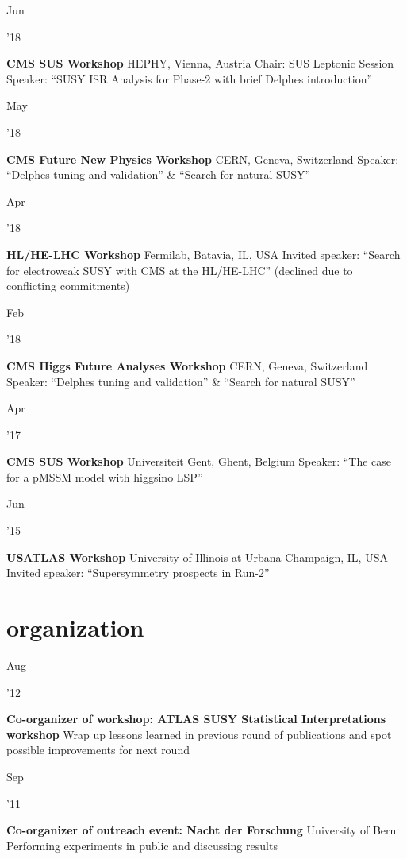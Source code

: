 \documentclass[]{cv} %
\begin{document}
\begin{entrylist}

  \entry
  {\parbox[t]{\parboxWidthOne}{Jun}\parbox[t]{\parboxWidthTwo}{\hfill '18}}
  {\textbf{CMS SUS Workshop}}
  {HEPHY, Vienna, Austria}
  {Chair: SUS Leptonic Session\\
  Speaker: ``SUSY ISR Analysis for Phase-2 with brief Delphes introduction''}

  \entry
  {\parbox[t]{\parboxWidthOne}{May}\parbox[t]{\parboxWidthTwo}{\hfill '18}}
  {\textbf{CMS Future New Physics Workshop}}
  {CERN, Geneva, Switzerland}
  {Speaker: ``Delphes tuning and validation'' \& ``Search for natural SUSY''}

  \entry
  {\parbox[t]{\parboxWidthOne}{Apr}\parbox[t]{\parboxWidthTwo}{\hfill '18}}
  {\textbf{HL/HE-LHC Workshop}}
  {Fermilab, Batavia, IL, USA}
  {Invited speaker: ``Search for electroweak SUSY with CMS at the HL/HE-LHC'' (declined
  due to conflicting commitments)}

  \entry
  {\parbox[t]{\parboxWidthOne}{Feb}\parbox[t]{\parboxWidthTwo}{\hfill '18}}
  {\textbf{CMS Higgs Future Analyses Workshop}}
  {CERN, Geneva, Switzerland}
  {Speaker: ``Delphes tuning and validation'' \& ``Search for natural SUSY''}

  \entry
  {\parbox[t]{\parboxWidthOne}{Apr}\parbox[t]{\parboxWidthTwo}{\hfill '17}}
  {\textbf{CMS SUS Workshop}}
  {Universiteit Gent, Ghent, Belgium}
  {Speaker: ``The case for a pMSSM model with higgsino LSP''}

  \entry
  {\parbox[t]{\parboxWidthOne}{Jun}\parbox[t]{\parboxWidthTwo}{\hfill '15}}
  {\textbf{USATLAS Workshop}}
  {University of Illinois at Urbana-Champaign, IL, USA}
  {Invited speaker: ``Supersymmetry prospects in Run-2''}

\end{entrylist}

\section{organization}

\begin{entrylist}

  \entry
  {\parbox[t]{\parboxWidthOne}{Aug}\parbox[t]{\parboxWidthTwo}{\hfill '12}}
  {\textbf{Co-organizer of workshop: ATLAS SUSY Statistical Interpretations workshop}}
  {}
  {Wrap up lessons learned in previous round of publications and spot possible
  improvements for next round}

  \entry
  {\parbox[t]{\parboxWidthOne}{Sep}\parbox[t]{\parboxWidthTwo}{\hfill '11}}
  {\textbf{Co-organizer of outreach event: Nacht der Forschung}}
  {University of Bern}
  {Performing experiments in public and discussing results}

\end{entrylist}
\end{document}
